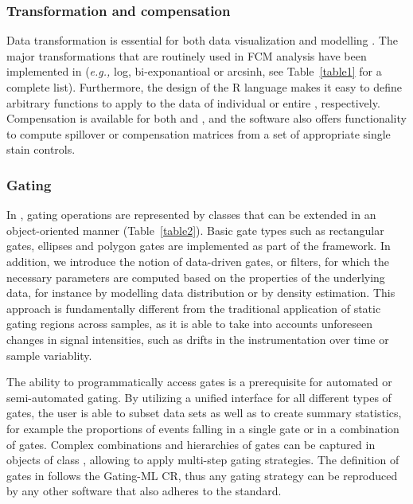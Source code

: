 \documentclass[10pt]{bmc_article}
\newenvironment{bmcformat}{\begin{raggedright}\baselineskip20pt\sloppy\setboolean{publ}{false}}{\end{raggedright}\baselineskip20pt\sloppy}
\begin{document}
\begin{bmcformat}
\subsubsection*{Transformation and compensation}

Data transformation is essential for both data visualization and
modelling \citep{lo2008agf}. The major transformations that are
routinely used in FCM analysis have been implemented in
 (\textit{e.g.,} log, bi-exponantioal or arcsinh,
see Table~\ref{table1} for a complete list). Furthermore, the design
of the R language makes it easy to define arbitrary functions to apply
to the data of individual  or entire
, respectively. Compensation is available for both
 and , and the software also
offers functionality to compute spillover or compensation matrices
from a set of appropriate single stain controls.

\subsubsection*{Gating}
In , gating operations are represented by classes
that can be extended in an object-oriented manner
(Table~\ref{table2}). Basic gate types such as rectangular gates,
ellipses and polygon gates are implemented as part of the
framework. In addition, we introduce the notion of data-driven gates,
or filters, for which the necessary parameters are computed based on
the properties of the underlying data, for instance by modelling data
distribution or by density estimation. This approach is fundamentally
different from the traditional application of static gating regions
across samples, as it is able to take into accounts unforeseen changes
in signal intensities, such as drifts in the instrumentation
over time or sample variablity.

The ability to programmatically access gates is a prerequisite for
automated or semi-automated gating. By utilizing a unified interface
for all different types of gates, the user is able to subset data sets
as well as to create summary statistics, for example the proportions
of events falling in a single gate or in a combination of
gates. Complex combinations and hierarchies of gates can be captured
in objects of class , allowing to apply multi-step
gating strategies. The definition of gates in 
follows the Gating-ML CR, thus any  gating strategy
can be reproduced by any other software that also adheres to the
standard.


\end{bmcformat}
\end{document}
